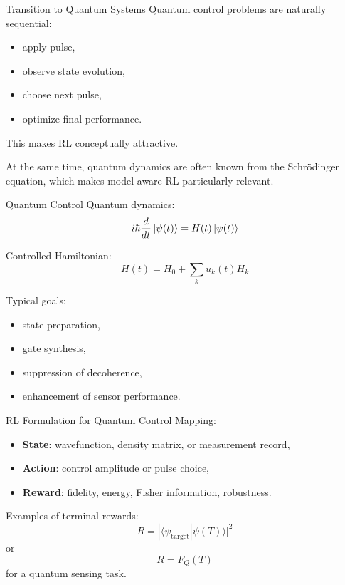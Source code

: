 \documentclass{beamer}
\begin{document}
\begin{frame}{Transition to Quantum Systems}
  Quantum control problems are naturally sequential:
  \begin{itemize}
  \item apply pulse,
  \item observe state evolution,
  \item choose next pulse,
  \item optimize final performance.
  \end{itemize}

  This makes RL conceptually attractive.

  At the same time, quantum dynamics are often known from the Schr\"odinger equation, which makes model-aware RL particularly relevant.
\end{frame}

\begin{frame}{Quantum Control}
  Quantum dynamics:
  \[
  i\hbar \frac{d}{dt}\ket{\psi(t)} = H(t)\ket{\psi(t)}
  \]

  Controlled Hamiltonian:
  \[
  H(t)=H_0+\sum_k u_k(t)H_k
  \]

  Typical goals:
  \begin{itemize}
  \item state preparation,
  \item gate synthesis,
  \item suppression of decoherence,
  \item enhancement of sensor performance.
  \end{itemize}
\end{frame}

\begin{frame}{RL Formulation for Quantum Control}
  Mapping:
  \begin{itemize}
  \item \textbf{State}: wavefunction, density matrix, or measurement record,
  \item \textbf{Action}: control amplitude or pulse choice,
  \item \textbf{Reward}: fidelity, energy, Fisher information, robustness.
  \end{itemize}

  Examples of terminal rewards:
  \[
  R = |\langle \psi_{\mathrm{target}}|\psi(T)\rangle|^2
  \]
  or
  \[
  R = F_Q(T)
  \]
  for a quantum sensing task.
\end{frame}
\end{document}

